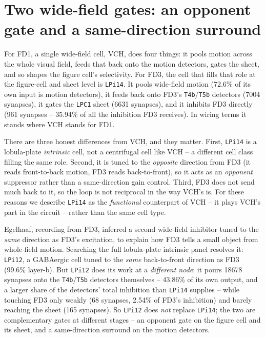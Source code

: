 \documentclass[11pt]{article}
\newcommand{\ttt}[1]{\texttt{#1}}
\begin{document}
\section{Two wide-field gates: an opponent gate and a same-direction surround}

For FD1, a single wide-field cell, VCH, does four things: it pools motion across the whole visual field, feeds that back onto the motion detectors, gates the sheet, and so shapes the figure cell's selectivity. For FD3, the cell that fills that role at the figure-cell and sheet level is \ttt{LPi14}. It pools wide-field motion (72.6\% of its own input is motion detectors), it feeds back onto FD3's \ttt{T4b}/\ttt{T5b} detectors (7004 synapses), it gates the \ttt{LPC1} sheet (6631 synapses), and it inhibits FD3 directly (961 synapses -- 35.94\% of all the inhibition FD3 receives). In wiring terms it stands where VCH stands for FD1.

There are three honest differences from VCH, and they matter. First, \ttt{LPi14} is a lobula-plate \emph{intrinsic} cell, not a centrifugal cell like VCH -- a different cell class filling the same role. Second, it is tuned to the \emph{opposite} direction from FD3 (it reads front-to-back motion, FD3 reads back-to-front), so it acts as an \emph{opponent} suppressor rather than a same-direction gain control. Third, FD3 does not send much back to it, so the loop is not reciprocal in the way VCH's is. For these reasons we describe \ttt{LPi14} as the \emph{functional} counterpart of VCH -- it plays VCH's part in the circuit -- rather than the same cell type.

Egelhaaf, recording from FD3, inferred a second wide-field inhibitor tuned to the \emph{same} direction as FD3's excitation, to explain how FD3 tells a small object from whole-field motion. Searching the full lobula-plate intrinsic panel resolves it: \ttt{LPi12}, a GABAergic cell tuned to the \emph{same} back-to-front direction as FD3 (99.6\% layer-b). But \ttt{LPi12} does its work at a \emph{different node}: it pours 18678 synapses onto the \ttt{T4b}/\ttt{T5b} detectors themselves -- 43.86\% of its own output, and a larger share of the detectors' total inhibition than \ttt{LPi14} supplies -- while touching FD3 only weakly (68 synapses, 2.54\% of FD3's inhibition) and barely reaching the sheet (165 synapses). So \ttt{LPi12} does \emph{not} replace \ttt{LPi14}; the two are complementary gates at different stages -- an opponent gate on the figure cell and its sheet, and a same-direction surround on the motion detectors.
\end{document}
